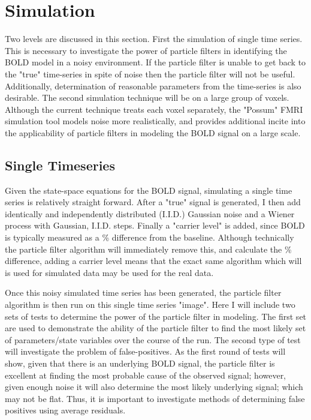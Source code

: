 \chapter{Simulation}
Two levels are discussed in this section. First the simulation of single time series.
This is necessary to investigate the power of particle filters in 
identifying the BOLD model in a noisy environment. If the particle filter is unable
to get back to the "true" time-series in spite of noise then the particle filter
will not be useful. Additionally, determination of reasonable parameters from the
time-series is also desirable. The second simulation technique will be on a 
large group of voxels. Although the current technique treats each voxel separately,
the "Possum" FMRI simulation tool models noise more realistically, and provides additional
incite into the applicability of particle filters in modeling the BOLD signal on a large
scale.

\section{Single Timeseries}
Given the state-space equations for the BOLD signal, simulating a single time 
series is relatively straight forward. After a "true" signal is generated,
I then add identically and independently distributed (I.I.D.) Gaussian noise and a Wiener
process with Gaussian, I.I.D. steps. Finally a "carrier level" is added, since BOLD is typically
measured as a \% difference from the baseline. Although technically the particle filter
algorithm will immediately remove this, and calculate the \% difference, adding a carrier 
level means that the exact same algorithm which will is used for 
simulated data may be used for the real data. 

Once this noisy simulated time series has been generated, the particle filter algorithm
 is then run on this single time series "image". Here I will include two sets of tests 
to determine the power of the particle filter in modeling. The first set are 
used to demonstrate the ability of the particle filter to find the most likely
set of parameters/state variables over the course of the run. The second type
of test will investigate the problem of false-positives. As the first
round of tests will show, given that there is an underlying BOLD signal, 
the particle filter is excellent at finding the most probable cause of 
the observed signal; however, given enough noise it will also determine
the most likely underlying signal; which may not be flat. Thus, it is 
important to investigate methods of determining false positives using 
average residuals.

